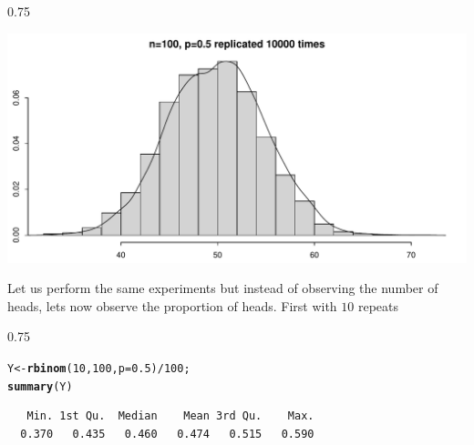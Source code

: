 \documentclass{beamer}\usepackage[]{graphicx}\usepackage[]{color}
\makeatletter
\newcommand{\hlnum}[1]{\textcolor[rgb]{0.2,0.2,0.2}{#1}}%
\newcommand{\hlopt}[1]{\textcolor[rgb]{0.102,0.102,0.102}{#1}}%
\newcommand{\hlstd}[1]{\textcolor[rgb]{0.102,0.102,0.102}{#1}}%
\newcommand{\hlkwb}[1]{\textcolor[rgb]{0.102,0.102,0.102}{#1}}%
\newcommand{\hlkwc}[1]{\textcolor[rgb]{0.2,0.2,0.2}{#1}}%
\newcommand{\hlkwd}[1]{\textcolor[rgb]{0.102,0.102,0.102}{\textbf{#1}}}%
\newenvironment{kframe}{%
 \def\at@end@of@kframe{}%
 \ifinner\ifhmode%
  \def\at@end@of@kframe{\end{minipage}}%
  \begin{minipage}{\columnwidth}%
 \fi\fi%
 \def\FrameCommand##1{\hskip\@totalleftmargin \hskip-\fboxsep
 \colorbox{shadecolor}{##1}\hskip-\fboxsep
     \hskip-\linewidth \hskip-\@totalleftmargin \hskip\columnwidth}%
 \MakeFramed {\advance\hsize-\width
   \@totalleftmargin\z@ \linewidth\hsize
   \@setminipage}}%
 {\par\unskip\endMakeFramed%
 \at@end@of@kframe}
\newenvironment{knitrout}{}{} %
\renewenvironment{knitrout}{\begin{spacing}{0.75}\begin{tiny}}{\end{tiny}\end{spacing}}
\makeatother
\begin{document}
\begin{frame}[fragile]

\begin{knitrout}\small
{}\color{fgcolor}

{\centering \includegraphics[width=0.89\linewidth]{figure/graphics-unnamed-chunk-7-1} 

}



\end{knitrout}

\end{frame}

\begin{frame}[fragile]

Let us perform the same experiments but instead of observing the number of heads, lets now observe the proportion of heads. First with $10$ repeats

\begin{knitrout}\small
{}\color{fgcolor}\begin{kframe}
\begin{alltt}
\hlstd{Y} \hlkwb{<-} \hlkwd{rbinom}\hlstd{(}\hlnum{10}\hlstd{,} \hlnum{100}\hlstd{,} \hlkwc{p}\hlstd{=}\hlnum{0.5}\hlstd{)}\hlopt{/} \hlnum{100}\hlstd{;}
\hlkwd{summary}\hlstd{(Y)}
\end{alltt}
\begin{verbatim}
   Min. 1st Qu.  Median    Mean 3rd Qu.    Max. 
  0.370   0.435   0.460   0.474   0.515   0.590 
\end{verbatim}
\end{kframe}
\end{knitrout}

\end{frame}
\end{document}
